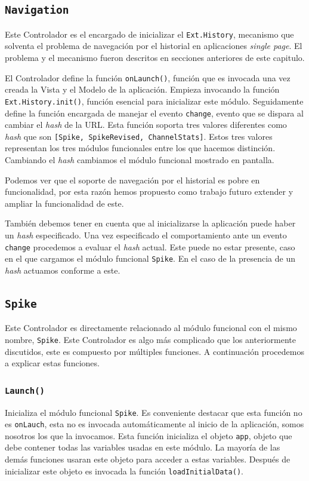 	\subsection{\texttt{Navigation}}
		Este Controlador es el encargado de inicializar el \texttt{Ext.History}, mecanismo que solventa el problema de navegación por el
		historial en aplicaciones \emph{single page}. El problema y el mecanismo fueron descritos en secciones anteriores de este capitulo.
		\par
		El Controlador define la función \texttt{onLaunch()}, función que es invocada una vez creada la Vista y el Modelo de la aplicación.
		Empieza invocando la función \texttt{Ext.History.init()}, función esencial para inicializar este módulo. Seguidamente define la
		función encargada de manejar el evento \texttt{change}, evento que se dispara al cambiar el \emph{hash} de la URL. Esta función
		soporta tres valores diferentes como \emph{hash} que son \texttt{[Spike, SpikeRevised, ChannelStats]}. Estos tres valores representan
		los tres módulos funcionales entre los que hacemos distinción.  Cambiando el \emph{hash} cambiamos el módulo funcional mostrado en
		pantalla.
		\par
		Podemos ver que el soporte de navegación por el historial es pobre en funcionalidad, por esta razón hemos propuesto como trabajo
		futuro extender y ampliar la funcionalidad de este.
		\par
		También debemos tener en cuenta que al inicializarse la aplicación puede haber un \emph{hash} especificado. Una vez especificado el
		comportamiento ante un evento \texttt{change} procedemos a evaluar el \emph{hash} actual. Este puede no estar presente, caso en el que
		cargamos el módulo funcional \texttt{Spike}. En el caso de la presencia de un \emph{hash} actuamos conforme a este.
	\subsection{\texttt{Spike}}
		Este Controlador es directamente relacionado al módulo funcional con el mismo nombre, \texttt{Spike}. Este Controlador es algo más
		complicado que los anteriormente discutidos, este es compuesto por múltiples funciones. A continuación procedemos a explicar estas
		funciones.
		\subsubsection{\texttt{Launch()}}
			Inicializa el módulo funcional \texttt{Spike}. Es conveniente destacar que esta función no es \texttt{onLauch}, esta no es
			invocada automáticamente al inicio de la aplicación, somos nosotros los que la invocamos. Esta función inicializa el objeto
			\texttt{app}, objeto que debe contener todas las variables usadas en este módulo. La mayoría de las demás funciones usaran
			este objeto para acceder a estas variables. Después de inicializar este objeto es invocada la función
			\texttt{loadInitialData()}.
